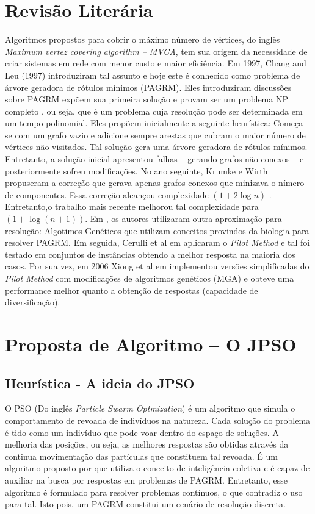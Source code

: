 \documentclass{sig-alternate-05-2015}
\begin{document}
\section{Revisão Literária} \label{sec2}
Algoritmos propostos para cobrir o máximo número de vértices, do inglês \textit{Maximum vertez covering algorithm -- MVCA}, tem sua origem da necessidade de criar sistemas em rede com menor custo e maior eficiência. Em 1997, Chang and Leu (1997) introduziram tal assunto e hoje este é conhecido como problema de árvore geradora de rótulos mínimos (PAGRM).
Eles introduziram discussões sobre PAGRM expõem  sua primeira solução e provam ser um problema NP completo \cite{Ladner:1975:SPT:321864.321877}, ou seja, que é um problema cuja resolução pode ser determinada em um tempo polinomial. Eles propõem inicialmente a seguinte heurística: Começa-se com um grafo vazio e adicione sempre arestas que cubram o maior número de vértices não visitados. Tal solução gera uma árvore geradora de rótulos mínimos. Entretanto, a solução inicial apresentou falhas -- gerando grafos não conexos -- e posteriormente sofreu modificações.
No ano seguinte, Krumke e Wirth \cite{krumke1998minimum} propuseram a correção que gerava apenas grafos conexos que minizava o nímero de componentes. Essa correção alcançou complexidade $(1 + 2 \log{n})$ . Entretanto,o trabalho mais recente \cite{wan2002note} melhorou tal complexidade para $ ( 1 + \log {(n + 1)}) $.
Em \cite{xiong2005one}, os autores utilizaram outra aproximação para resolução: Algotimos Genéticos que utilizam conceitos provindos da biologia para resolver PAGRM. Em seguida, Cerulli et al em \cite{cerulli2005metaheuristics} aplicaram o \textit{Pilot Method} e tal foi testado em conjuntos de instâncias obtendo a melhor resposta na maioria dos casos. Por sua vez, em 2006 Xiong et al em \cite{xiong2006improved} implementou versões simplificadas do \textit{Pilot Method} com modificações  de algoritmos genéticos (MGA) e obteve uma performance melhor quanto a obtenção de respostas (capacidade de diversificação). 
\section{Proposta de Algoritmo -- O JPSO} \label{sec3}

\subsection{Heurística - A ideia do JPSO}

O PSO (Do inglês \textit{Particle Swarm Optmization}) é um algoritmo que simula o comportamento de revoada de indivíduos na natureza. Cada solução do problema  é tido como um indivíduo que pode voar dentro do espaço de soluções. A melhoria das posições, ou seja, as melhores respostas são obtidas através da continua movimentação das partículas que constituem tal revoada. É um algoritmo proposto por \cite{consoli2008discrete} que utiliza o conceito de inteligência coletiva e é capaz de auxiliar na busca por respostas em problemas de PAGRM. Entretanto, esse algoritmo é formulado para resolver problemas contínuos, o que contradiz o uso para tal. Isto pois, um PAGRM constitui um cenário de resolução discreta.
\end{document}
